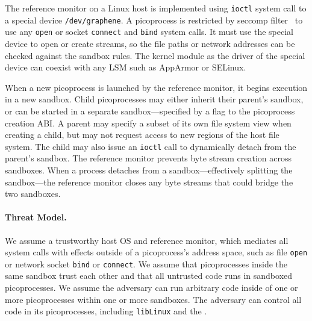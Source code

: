 The \sysname{} reference monitor on a Linux host
is implemented using {\tt ioctl} system call to a special device {\tt /dev/graphene}.
A picoprocess is restricted by seccomp filter~\citep{seccomp} to use any {\tt open} or socket {\tt connect} and {\tt bind} system calls.
It must use the \sysname{} special device to open or create streams,
so the file paths or network addresses can be checked against the sandbox rules.
The kernel module as the driver of the \sysname{} special device can coexist with any LSM such as AppArmor or SELinux.


When a new picoprocess is launched by the reference monitor, it begins execution in 
a new sandbox.  
Child picoprocesses may either inherit their parent's sandbox, 
or can be started in a separate sandbox---specified
by a flag to the picoprocess creation ABI.
A parent may specify a subset of its own file system view 
when creating a child, but may not request access to new regions of the 
host file system. 
The child may also issue an {\tt ioctl} call to 
dynamically detach from the parent's sandbox. The reference monitor prevents byte stream creation 
across sandboxes.
When a process detaches from a sandbox---effectively splitting the sandbox---the
reference monitor closes
any byte streams that could bridge the two sandboxes.

\paragraph{Threat Model.}
We assume  a trustworthy host OS and reference monitor,
which mediates all system calls with effects outside of a picoprocess's address space,
such as file {\tt open} or network socket {\tt bind} or {\tt connect}.
We assume that picoprocesses inside the same sandbox trust each other and that all untrusted code runs in sandboxed picoprocesses.
We assume the adversary can run arbitrary code inside of
one or more picoprocesses within one or more sandboxes.
The adversary can control all code in its
picoprocesses, including {\tt libLinux} and the \pal{}. 

